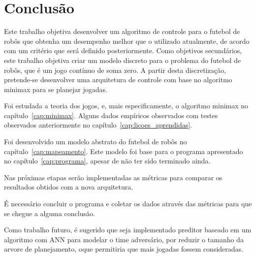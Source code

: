 \chapter{Conclusão}\label{cap:conclusao}


Este trabalho objetiva desenvolver um algoritmo de controle para o futebol
de robôs que obtenha um desempenho melhor que o utilizado atualmente, de acordo
com um critério que será definido posteriormente.
Como objetivos secundários, este trabalho objetiva criar um modelo discreto para
o problema do futebol de robôs, que é um jogo contínuo de soma zero.
A partir desta discretização, pretende-se desenvolver uma arquitetura de
controle com base no algoritmo minimax para se planejar jogadas.

Foi estudada a teoria dos jogos, e, mais especificamente, o algoritmo minimax
no capítulo~\ref{cap:minimax}. Alguns dados empíricos observados com testes
observados anteriormente no capítulo~\ref{cap:licoes_aprendidas}.

Foi desenvolvido um modelo abstrato do futebol de robôs no
capítulo~\ref{cap:mapeamento}. Este modelo foi base para o programa apresentado
no capítulo~\ref{cap:programa}, apesar de não ter sido terminado ainda.

Nas próximas etapas serão implementadas as métricas para comparar os resultados
obtidos com a nova arquitetura.

É necessário concluir o programa e coletar os dados através das métricas para
que se chegue a alguma conclusão.

Como trabalho futuro, é sugerido que seja implementado preditor baseado em
um algoritmo com ANN para modelar o time adversário, por reduzir o tamanho da
arvore de planejamento, oque permitiria que mais jogadas fossem consideradas.

